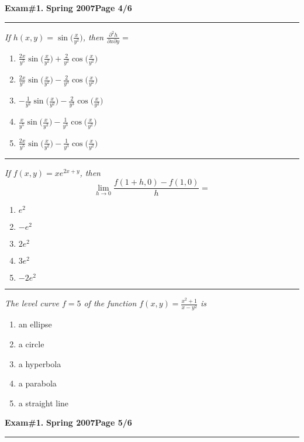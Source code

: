 \documentclass[12pt]{article}
\begin{document}
\hfill{\large\bf Exam\#1.}\hfill{\large\bf
  Spring 2007}\hfill{\large\bf Page 4/6}\hrule

\bigskip
{\problem[10 pts] \em If $h(x,y) = \sin \Big( \displaystyle{\frac{x}{y^2}} \Big)$, then
$\displaystyle{\frac{\partial^2 h}{\partial x \partial y}}=$}
\begin{enumerate}
\item $\displaystyle{\frac{2x}{y^5} \sin\Big( \frac{x}{y^2} \Big) + \frac{2}{y^2} \cos \Big( \frac{x}{y^2} \Big)}$
\item $\displaystyle{\frac{2x}{y^5} \sin\Big( \frac{x}{y^2} \Big) - \frac{2}{y^3} \cos \Big( \frac{x}{y^2} \Big)}$
\item $-\displaystyle{\frac{1}{y^2} \sin\Big( \frac{x}{y^2} \Big) - \frac{2}{y^3} \cos \Big( \frac{x}{y^2} \Big)}$
\item $\displaystyle{\frac{x}{y^5} \sin\Big( \frac{x}{y^2} \Big) - \frac{1}{y^3} \cos \Big( \frac{x}{y^2} \Big)}$
\item $\displaystyle{\frac{2x}{y^5} \sin\Big( \frac{x}{y^2} \Big) - \frac{1}{y^3} \cos \Big( \frac{x}{y^2} \Big)}$
\end{enumerate}
\hrule

{\problem[10 pts] \em If $f(x,y) = xe^{2x+y}$, then }
$$ \lim_{h \to 0} \frac{f(1+h,0)- f(1,0)}{h} = $$
\begin{enumerate}
\item $e^2$
\item $-e^2$
\item $2e^2$
\item $3e^2$
\item $-2e^2$
\end{enumerate}
\vspace{2cm}
\hrule

{\problem[10 pts] \em The level curve $f=5$ of the function $f(x,y) =
  \displaystyle{ \frac{x^2+1}{x-y^2} }$ is}
\begin{enumerate}
\item an ellipse
\item a circle
\item a hyperbola
\item a parabola
\item a straight line
\end{enumerate}

\newpage

\hfill{\large\bf Exam\#1.}\hfill{\large\bf
  Spring 2007}\hfill{\large\bf Page 5/6}\hrule
\end{document}
